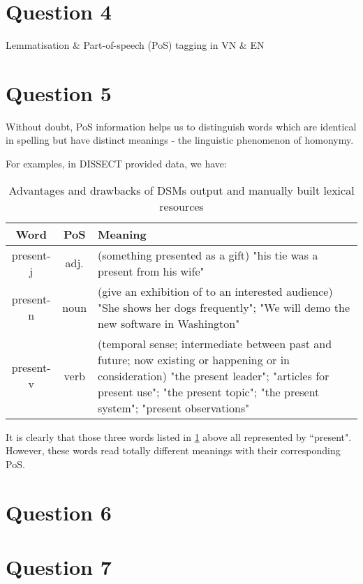 \documentclass[]{article}
\begin{document}
\section{Question 4}

Lemmatisation \& Part-of-speech (PoS) tagging in VN \& EN

\section{Question 5}
Without doubt, PoS information helps us to distinguish words which are identical in spelling but have distinct meanings - the linguistic phenomenon of homonymy.

For examples, in DISSECT provided data, we have:

\begin{table}
	\begin{tabular}{ | c | c | p{10cm} | }
		\hline
		Word & PoS & Meaning\footnotemark \\
		\hline
		present-j & adj. & (something presented as a gift) "his tie was a present from his wife"  \\
		\hline
		present-n & noun & (give an exhibition of to an interested audience) "She shows her dogs frequently"; "We will demo the new software in Washington" \\
		\hline
		present-v & verb & (temporal sense; intermediate between past and future; now existing or happening or in consideration) "the present leader"; "articles for present use"; "the present topic"; "the present system"; "present observations" \\	
		\hline
	\end{tabular}
\caption{Advantages and drawbacks of DSMs output and manually built lexical resources}
\label{table:2}
\end{table}

It is clearly that those three words listed in \ref{table:2} above all represented by ``present". However, these words read totally different meanings with their corresponding PoS.

\section{Question 6}

\section{Question 7}
\end{document}
